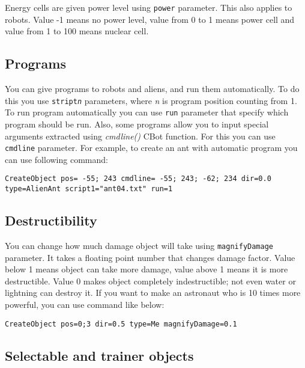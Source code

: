Energy cells are given power level using \texttt{power} parameter. This also applies to robots. Value -1 means no power level, value from 0 to 1 means power cell and value from 1 to 100 means nuclear cell.


\subsection{Programs}

You can give programs to robots and aliens, and run them automatically. To do this you use \texttt{stript\emph{n}} parameters, where \emph{n} is program position counting from 1. To run program automatically you can use \texttt{run} parameter that specify which program should be run. Also, some programs allow you to input special arguments extracted using \emph{cmdline()} CBot function. For this you can use \texttt{cmdline} parameter. For example, to create an ant with automatic program you can use following command:

\begin{verbatim}
CreateObject pos= -55; 243 cmdline= -55; 243; -62; 234 dir=0.0 type=AlienAnt script1="ant04.txt" run=1
\end{verbatim}


\subsection{Destructibility}

You can change how much damage object will take using \texttt{magnifyDamage} parameter. It takes a floating point number that changes damage factor. Value below 1 means object can take more damage, value above 1 means it is more destructible. Value 0 makes object completely indestructible; not even water or lightning can destroy it. If you want to make an astronaut who is 10 times more powerful, you can use command like below:

\begin{verbatim}
CreateObject pos=0;3 dir=0.5 type=Me magnifyDamage=0.1
\end{verbatim}


\subsection{Selectable and trainer objects}

